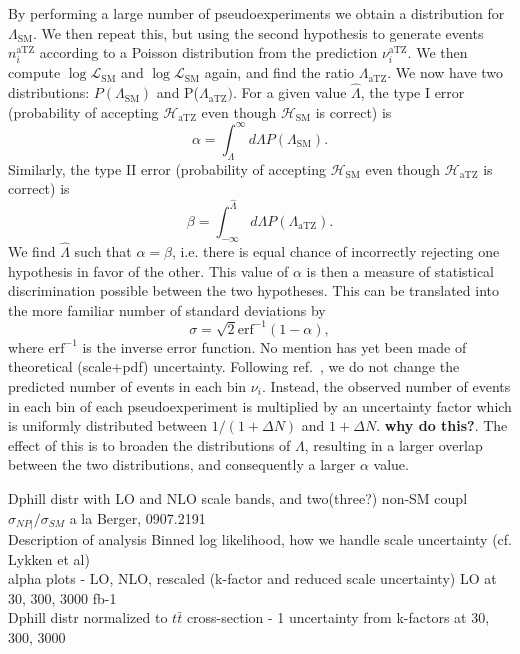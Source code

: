 \documentclass[preprint]{JHEP3} %
\newcommand{\SM}{\mathrm{SM}}
\newcommand{\aTZ}{\mathrm{aTZ}}
\def\hLambda {\hat{\Lambda}}
\def\erf{\mathrm{erf}}
\begin{document}
By performing a large number of pseudoexperiments we obtain a distribution for $\Lambda_{\SM}$. We then repeat this, but using the second hypothesis to generate events $n_i^{\aTZ}$ according to a Poisson distribution from the prediction $\nu_i^{\aTZ}$. We then compute $\log\mathcal{L}_{\SM}$ and $\log\mathcal{L}_{\SM}$ again, and find the ratio $\Lambda_{\aTZ}$. We now have two distributions: $P(\Lambda_{\SM})$ and P($\Lambda_{\aTZ})$. For a given value $\hat{\Lambda}$, the type I error (probability of accepting $\mathcal{H}_{\aTZ}$ even though $\mathcal{H}_{\SM}$ is correct) is
\begin{equation}
\alpha = \int_{\hLambda}^{\infty} d\Lambda P(\Lambda_{\SM}).
\end{equation}
Similarly, the type II error (probability of accepting $\mathcal{H}_{\SM}$ even though $\mathcal{H}_{\aTZ}$ is correct) is 
\begin{equation}
\beta = \int^{\hLambda}_{-\infty} d\Lambda P(\Lambda_{\aTZ}).
\end{equation}
We find $\hLambda$ such that $\alpha=\beta$, i.e. there is equal chance of incorrectly rejecting one hypothesis in favor of the other. This value of $\alpha$ is then a measure of statistical discrimination possible between the two hypotheses. This can be translated into the more familiar number of standard deviations by 
\begin{equation}
\sigma = \sqrt{2}\erf^{-1}(1-\alpha),
\end{equation}
where $\erf^{-1}$ is the inverse error function. 
No mention has yet been made of theoretical (scale+pdf) uncertainty. Following ref.~\cite{Lykken et al}, we do not change the predicted number of events in each bin $\nu_i$. Instead, the observed number of events in each bin of each pseudoexperiment is multiplied by an uncertainty factor which is uniformly distributed between $1/(1+\Delta N)$ and $1+\Delta N$. {\bf why do this?}. The effect of this is to broaden the distributions of $\Lambda$, resulting in a larger overlap between the two distributions, and consequently a larger $\alpha$ value.





Dphill distr with LO and NLO scale bands, and two(three?) non-SM coupl\\
$\sigma_{NP|} / \sigma_{SM}$ a la Berger, 0907.2191 \\

Description of analysis Binned log likelihood, how we handle scale uncertainty (cf. Lykken et al) \\
alpha plots - LO, NLO, rescaled (k-factor and reduced scale uncertainty) LO at 30, 300, 3000 fb-1\\
Dphill distr normalized to $t\bar{t}$ cross-section  - 1 uncertainty from k-factors at 30, 300, 3000\\
\end{document}
